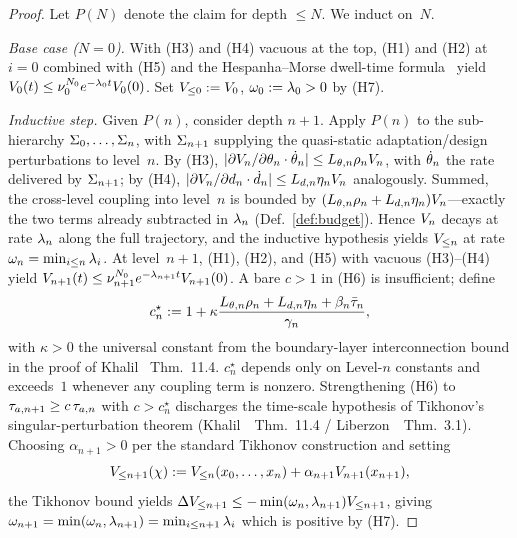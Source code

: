 \documentclass[conference]{IEEEtran}
\begin{document}
\begin{proof}
Let $P(N)$ denote the claim for depth $\leq N$.  We induct on~$N$.

\emph{Base case ($N=0$).}  With (H3) and (H4) vacuous at the top, (H1)
and (H2) at $i=0$ combined with (H5) and the Hespanha--Morse
dwell-time formula~\cite{hespanha1999stability} yield
$V_{0}(t) \leq \nu_0^{N_0} e^{-\lambda_0 t} V_{0}(0)$.
Set $V_{\leq 0} := V_{0}$, $\omega_0 := \lambda_0 > 0$ by (H7).

\emph{Inductive step.}  Given $P(n)$, consider depth $n+1$.  Apply
$P(n)$ to the sub-hierarchy $\Sigma_0, \ldots, \Sigma_n$, with $\Sigma_{n+1}$
supplying the quasi-static adaptation/design perturbations to
level~$n$.  By (H3),
$|\partial V_{n}/\partial\theta_n \cdot \dot{\theta}_n|
\leq L_{\theta,n}\rho_n V_{n}$, with $\dot{\theta}_n$ the rate
delivered by $\Sigma_{n+1}$; by (H4),
$|\partial V_{n}/\partial d_n \cdot \dot{d}_n|
\leq L_{d,n}\eta_n V_{n}$ analogously.  Summed, the cross-level
coupling into level~$n$ is bounded by
$(L_{\theta,n}\rho_n + L_{d,n}\eta_n)V_{n}$---exactly the two
terms already subtracted in $\lambda_n$ (Def.~\ref{def:budget}).  Hence
$V_{n}$ decays at rate $\lambda_n$ along the full trajectory, and
the inductive hypothesis yields $V_{\leq n}$ at rate
$\omega_n = \min_{i \leq n} \lambda_i$.  At level~$n+1$, (H1), (H2),
and (H5) with vacuous (H3)--(H4) yield
$V_{n+1}(t) \leq \nu_{n+1}^{N_0} e^{-\lambda_{n+1} t}
V_{n+1}(0)$.  A bare $c > 1$ in (H6) is insufficient; define
\begin{equation}
  c^\star_n
    := 1 + \kappa
      \frac{L_{\theta,n}\rho_n + L_{d,n}\eta_n + \beta_n\bar{\tau}_n}
           {\gamma_n},
  \label{eq:tikhonov-rate}
\end{equation}
with $\kappa > 0$ the universal constant from the boundary-layer
interconnection bound in the proof of
Khalil~\cite{khalil2002nonlinear} Thm.~11.4.  $c^\star_n$ depends only
on Level-$n$ constants and exceeds~$1$ whenever any coupling term is
nonzero.  Strengthening (H6) to
$\taua[n+1] \geq c\,\taua[n]$ with $c > c^\star_n$ discharges the
time-scale hypothesis of Tikhonov's singular-perturbation theorem
(Khalil~\cite{khalil2002nonlinear}~Thm.~11.4 /
Liberzon~\cite{liberzon2003switching}~Thm.~3.1).  Choosing
$\alpha_{n+1} > 0$ per the standard Tikhonov construction and setting
\begin{equation}
  V_{\leq n+1}(\chi)
    := V_{\leq n}(x_0,\ldots,x_n) + \alpha_{n+1}V_{n+1}(x_{n+1}),
\end{equation}
the Tikhonov bound yields
$\Delta V_{\leq n+1} \leq -\min(\omega_n, \lambda_{n+1})
V_{\leq n+1}$, giving
$\omega_{n+1} = \min(\omega_n, \lambda_{n+1})
= \min_{i \leq n+1} \lambda_i$ which is positive by (H7).
\end{proof}
\end{document}
